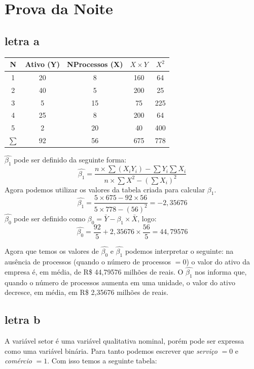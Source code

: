 \chapter{Prova da Noite}
\section*{letra a}
\begin{center}
	\begin{tabular}{|c|c|c|c|c|}
		\hline
		N        & Ativo (Y) & NProcessos (X) & \(X \times Y\) & \(X^2\) \\ \hline
		1        & 20        & 8              & 160            & 64      \\ \hline
		2        & 40        & 5              & 200            & 25      \\ \hline
		3        & 5         & 15             & 75             & 225     \\ \hline
		4        & 25        & 8              & 200            & 64      \\ \hline
		5        & 2         & 20             & 40             & 400     \\ \hline
		\(\sum\) & 92        & 56             & 675            & 778     \\ \hline
	\end{tabular}
\end{center}
\(\hat{\beta_{1}}\) pode ser definido da seguinte forma:
\[\hat{\beta_{1}} = \frac{n \times \sum (X_{i}Y_{i}) - \sum Y_{i}\sum X_{i}}{n \times \sum X^2 - (\sum X_{i})^2}\]
Agora podemos utilizar os valores da tabela criada para calcular \(\beta_{1}\).
\[ \hat{\beta_{1}} = \frac{5 \times 675 - 92 \times 56}{5 \times 778 - (56)^2} = -2,35676 \]
\(\hat{\beta_{0}}\) pode ser definido como \(\beta_{0} = \bar{Y} - \beta_{1} \times \bar{X}\), logo:
\[ \hat{\beta_{0}} = \frac{92}{5} + 2,35676 \times \frac{56}{5} = 44,79576 \]

Agora que temos os valores de \(\hat{\beta_{0}}\) e \(\hat{\beta_{1}}\) podemos interpretar o seguinte: na ausência de processos (quando o número de processos \(= 0\)) o valor do ativo da empresa é, em média, de R\$ 44,79576 milhões de reais. O \(\hat{\beta_{1}}\) nos informa que, quando o número de processos aumenta em uma unidade, o valor do ativo decresce, em média, em R\$ 2,35676 milhões de reais.

\section*{letra b}
A variável setor é uma variável qualitativa nominal, porém pode ser expressa como uma variável binária. Para tanto podemos escrever que \textit{serviço} \(= 0\) e \textit{comércio} \(= 1\). Com isso temos a seguinte tabela:

